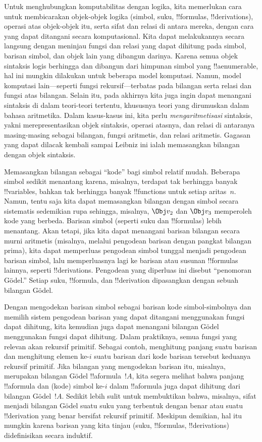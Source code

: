 \documentclass[../../../include/open-logic-section]{subfiles}
\begin{document}

Untuk menghubungkan komputabilitas dengan logika, kita memerlukan cara untuk
membicarakan objek-objek logika (simbol, suku, !!{formula}s,
!!{derivation}s), operasi atas objek-objek itu, serta sifat dan relasi di
antara mereka, dengan cara yang dapat ditangani secara komputasional. Kita
dapat melakukannya secara langsung dengan meninjau fungsi dan relasi yang dapat
dihitung pada simbol, barisan simbol, dan objek lain yang dibangun darinya.
Karena semua objek sintaksis logis berhingga dan dibangun dari himpunan simbol
yang !!a{enumerable}, hal ini mungkin dilakukan untuk beberapa model
komputasi. Namun, model komputasi lain---seperti fungsi rekursif---terbatas
pada bilangan serta relasi dan fungsi atas bilangan. Selain itu, pada akhirnya
kita juga ingin dapat menangani sintaksis di dalam teori-teori tertentu,
khususnya teori yang dirumuskan dalam bahasa aritmetika. Dalam kasus-kasus ini,
kita perlu \emph{mengaritmetisasi} sintaksis, yakni merepresentasikan objek
sintaksis, operasi atasnya, dan relasi di antaranya masing-masing sebagai
bilangan, fungsi aritmetis, dan relasi aritmetis. Gagasan yang dapat dilacak
kembali sampai Leibniz ini ialah memasangkan bilangan dengan objek sintaksis.

Memasangkan bilangan sebagai ``kode'' bagi simbol relatif mudah. Beberapa
simbol sedikit menantang karena, misalnya, terdapat tak berhingga banyak
!!{variable}s, bahkan tak berhingga banyak !!{function}s untuk setiap
aritas~$n$. Namun, tentu saja kita dapat memasangkan bilangan dengan simbol
secara sistematis sedemikian rupa sehingga, misalnya, $\Obj v_2$ dan
$\Obj v_3$ memperoleh kode yang berbeda. Barisan simbol (seperti suku dan
!!{formula}s) lebih menantang. Akan tetapi, jika kita dapat menangani barisan
bilangan secara murni aritmetis (misalnya, melalui pengodean barisan dengan
pangkat bilangan prima), kita dapat memperluas pengodean simbol tunggal
menjadi pengodean barisan simbol, lalu memperluasnya lagi ke barisan atau
susunan !!{formula}s lainnya, seperti !!{derivation}s. Pengodean yang
diperluas ini disebut ``penomoran G\"odel.'' Setiap suku, !!{formula}, dan
!!{derivation} dipasangkan dengan sebuah bilangan G\"odel.

Dengan mengodekan barisan simbol sebagai barisan kode simbol-simbolnya dan
memilih sistem pengodean barisan yang dapat ditangani menggunakan fungsi dapat
dihitung, kita kemudian juga dapat menangani bilangan G\"odel menggunakan
fungsi dapat dihitung. Dalam praktiknya, semua fungsi yang relevan akan
rekursif primitif. Sebagai contoh, menghitung panjang suatu barisan dan
menghitung elemen ke-$i$ suatu barisan dari kode barisan tersebut keduanya
rekursif primitif. Jika bilangan yang mengodekan barisan itu, misalnya,
merupakan bilangan G\"odel !!a{formula}~$!A$, kita segera melihat bahwa
panjang !!a{formula} dan (kode) simbol ke-$i$ dalam !!a{formula} juga dapat
dihitung dari bilangan G\"odel~$!A$. Sedikit lebih sulit untuk membuktikan
bahwa, misalnya, sifat menjadi bilangan G\"odel suatu suku yang terbentuk
dengan benar atau suatu !!{derivation} yang benar bersifat rekursif primitif.
Meskipun demikian, hal itu mungkin karena barisan yang kita tinjau (suku,
!!{formula}s, !!{derivation}s) didefinisikan secara induktif.
\end{document}
